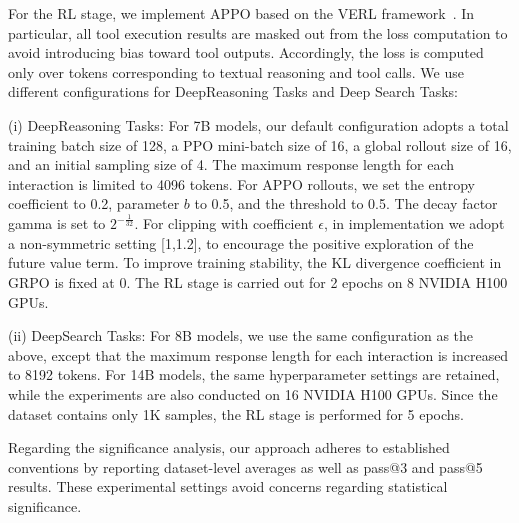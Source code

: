 \documentclass{article}
\begin{document}
For the RL stage, we implement APPO based on the VERL framework~\cite{sheng2025hybridflow}. In particular, all tool execution results are masked out from the loss computation to avoid introducing bias toward tool outputs. Accordingly, the loss is computed only over tokens corresponding to textual reasoning and tool calls. We use different configurations for DeepReasoning Tasks and Deep Search Tasks:

(i) DeepReasoning Tasks: For 7B models,  our default configuration adopts a total training batch size of 128, a PPO mini-batch size of 16, a global rollout size of 16, and an initial sampling size of 4. The maximum response length for each interaction is limited to 4096 tokens. For APPO rollouts, we set the entropy coefficient to 0.2, parameter $b$ to 0.5, and the threshold to 0.5. The decay factor gamma is set to $2^{-\frac{1}{32}}$. For clipping with coefficient $\epsilon$, in implementation we adopt a non-symmetric setting  [1,1.2], to encourage the positive exploration of the future value term.  To improve training stability, the KL divergence coefficient in GRPO is fixed at 0. The RL stage is carried out for 2 epochs on 8 NVIDIA H100 GPUs.

(ii) DeepSearch Tasks: For 8B models, we use the same configuration as the above, except that the maximum response length for each interaction is increased to 8192 tokens. For 14B models, the same hyperparameter settings are retained, while the experiments are also conducted on 16 NVIDIA H100 GPUs. Since the dataset contains only 1K samples, the RL stage is performed for 5 epochs.

Regarding the significance analysis, our approach adheres to established conventions by reporting dataset-level averages as well as pass@3 and pass@5 results. These experimental settings avoid concerns regarding statistical significance.



\begin{table}[t]
\caption{Analysis on branching configuration with Qwen2.5-7B-Instruct. The best results are in \textbf{bold}.}
\centering
\label{tab:appx} 
\renewcommand{\arraystretch}{1.1}   
\setlength\tabcolsep{6pt} 
\vspace{-0.4cm}
\end{table}	 	 
 
\end{document}
